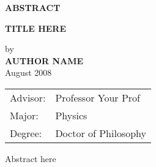 
\begin{center}
\textbf{ABSTRACT}
	
	
	\singlespacing
\textbf{TITLE HERE}\\
	\doublespacing
	
	by\\
	
	\textbf{AUTHOR NAME}\\
	August 2008\\
\end{center}
\begin{tabular}{ll}	
Advisor: &Professor Your Prof\\
Major:   &Physics\\
Degree:  &Doctor of Philosophy
\end{tabular}
\bigskip

Abstract here

